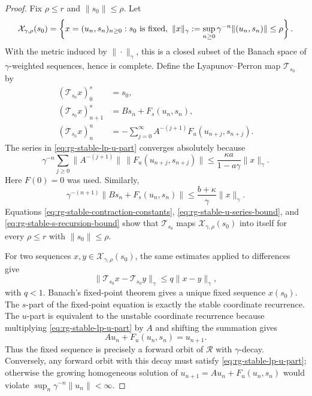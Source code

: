 \begin{proof}
Fix \(\rho\leq r\) and \(\|s_0\|\leq \rho\).  Let
\[
  \mathcal X_{\gamma,\rho}(s_0)
  =
  \left\{
    x=(u_n,s_n)_{n\geq0}:
    s_0\ {\rm is\ fixed},\
    \|x\|_\gamma:=\sup_{n\geq0}\gamma^{-n}\|(u_n,s_n)\|\leq\rho
  \right\}.
\]
With the metric induced by \(\|\cdot\|_\gamma\), this is a closed subset of
the Banach space of \(\gamma\)-weighted sequences, hence is complete.  Define
the Lyapunov--Perron map \(\mathcal T_{s_0}\) by
\begin{align}
  (\mathcal T_{s_0}x)^s_0&=s_0,\\
  (\mathcal T_{s_0}x)^s_{n+1}
    &=B s_n+F_s(u_n,s_n), \label{eq:rg-stable-lp-s-part}\\
  (\mathcal T_{s_0}x)^u_n
    &=
    -\sum_{j=0}^{\infty}
      A^{-(j+1)}F_u(u_{n+j},s_{n+j}).
      \label{eq:rg-stable-lp-u-part}
\end{align}
The series in \eqref{eq:rg-stable-lp-u-part} converges absolutely because
\begin{equation}
  \gamma^{-n}
  \sum_{j\geq0}
  \|A^{-(j+1)}\|\,\|F_u(u_{n+j},s_{n+j})\|
  \leq
  \frac{\kappa a}{1-a\gamma}\|x\|_\gamma .
  \label{eq:rg-stable-u-series-bound}
\end{equation}
Here \(F(0)=0\) was used.  Similarly,
\begin{equation}
  \gamma^{-(n+1)}
  \|B s_n+F_s(u_n,s_n)\|
  \leq
  \frac{b+\kappa}{\gamma}\|x\|_\gamma .
  \label{eq:rg-stable-s-recursion-bound}
\end{equation}
Equations \eqref{eq:rg-stable-contraction-constants},
\eqref{eq:rg-stable-u-series-bound}, and
\eqref{eq:rg-stable-s-recursion-bound} show that
\(\mathcal T_{s_0}\) maps \(\mathcal X_{\gamma,\rho}(s_0)\) into itself
for every \(\rho\leq r\) with \(\|s_0\|\leq\rho\).

For two sequences \(x,y\in\mathcal X_{\gamma,\rho}(s_0)\), the same
estimates applied to differences give
\begin{equation}
  \|\mathcal T_{s_0}x-\mathcal T_{s_0}y\|_\gamma
  \leq
  q\|x-y\|_\gamma ,
  \label{eq:rg-stable-lp-contraction}
\end{equation}
with \(q<1\).  Banach's fixed-point theorem gives a unique fixed sequence
\(x(s_0)\).  The \(s\)-part of the fixed-point equation is exactly the
stable coordinate recurrence.  The \(u\)-part is equivalent to the unstable
coordinate recurrence because multiplying
\eqref{eq:rg-stable-lp-u-part} by \(A\) and shifting the summation gives
\[
  A u_n+F_u(u_n,s_n)=u_{n+1}.
\]
Thus the fixed sequence is precisely a forward orbit of \(\mathcal R\) with
\(\gamma\)-decay.  Conversely, any forward orbit with this decay must satisfy
\eqref{eq:rg-stable-lp-u-part}; otherwise the growing homogeneous solution
of \(u_{n+1}=Au_n+F_u(u_n,s_n)\) would violate
\(\sup_n\gamma^{-n}\|u_n\|<\infty\).


\end{proof}

